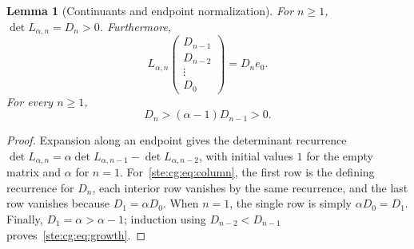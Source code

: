 \documentclass[11pt,letterpaper]{article}
\newtheorem{lemma}[theorem]{Lemma}
\theoremstyle{definition}
\theoremstyle{remark}
\begin{document}
\begin{lemma}[Continuants and endpoint normalization]\label{ste:cg:lem:continuants}
For $n\ge1$, $\det L_{\alpha,n}=D_n>0$. Furthermore,
\begin{equation}\label{ste:cg:eq:column}
 L_{\alpha,n}
 \begin{pmatrix}D_{n-1}\\D_{n-2}\\\vdots\\D_0\end{pmatrix}
 =D_n e_0.
\end{equation}
For every $n\ge1$,
\begin{equation}\label{ste:cg:eq:growth}
 D_n>(\alpha-1)D_{n-1}>0.
\end{equation}
\end{lemma}
\begin{proof}
Expansion along an endpoint gives the determinant recurrence
$\det L_{\alpha,n}=\alpha\det L_{\alpha,n-1}-\det L_{\alpha,n-2}$,
with initial values $1$ for the empty matrix and $\alpha$ for $n=1$.
For~\eqref{ste:cg:eq:column}, the first row is the defining recurrence for $D_n$,
each interior row vanishes by the same recurrence, and the last row
vanishes because $D_1=\alpha D_0$. When $n=1$, the single row is simply
$\alpha D_0=D_1$. Finally, $D_1=\alpha>\alpha-1$; induction using
$D_{n-2}<D_{n-1}$ proves~\eqref{ste:cg:eq:growth}.
\end{proof}
\end{document}
